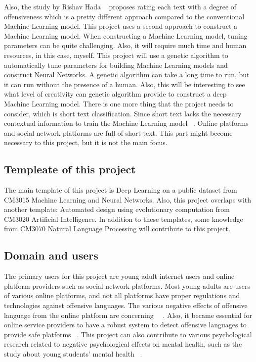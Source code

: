 \documentclass[11pt, natbib=false]{article}
\begin{document}
\begin{multicols}{2}
Also, the study by Rishav Hada ~\cite{hada2021ruddit} proposes rating each text with a degree of offensiveness which is a pretty different approach compared to the conventional Machine Learning model.
This project uses a second approach to construct a Machine Learning model.
When constructing a Machine Learning model, tuning parameters can be quite challenging.
Also, it will require much time and human resources, in this case, myself.
This project will use a genetic algorithm to automatically tune parameters for building Machine Learning models and construct Neural Networks.
A genetic algorithm can take a long time to run, but it can run without the presence of a human.
Also, this will be interesting to see what level of creativity can genetic algorithm provide to construct a deep Machine Learning model.
There is one more thing that the project needs to consider, which is short text classification.
Since short text lacks the necessary contextual information to train the Machine Learning model ~\cite{wang2021short}.
Online platforms and social network platforms are full of short text.
This part might become necessary to this project, but it is not the main focus. 

\subsection{Templeate of this project}
The main template of this project is Deep Learning on a public dataset from CM3015 Machine Learning and Neural Networks. Also, this project overlaps with another template: Automated design using evolutionary computation from CM3020 Artificial Intelligence. In addition to these templates, some knowledge from CM3070 Natural Language Processing will contribute to this project. 

\subsection{Domain and users}
The primary users for this project are young adult internet users and online platform providers such as social network platforms.
Most young adults are users of various online platforms, and not all platforms have proper regulations and technologies against offensive languages.
The various negative effects of offensive language from the online platform are concerning ~\cite{babvey2021using}~\cite{shi2021influence}.
Also, it became essential for online service providers to have a robust system to detect offensive languages to provide safe platforms ~\cite{vidgen2019challenges}.
This project can also contribute to various psychological research related to negative psychological effects on mental health, such as the study about young students’ mental health ~\cite{shi2021influence}.


\end{multicols}
\end{document}
